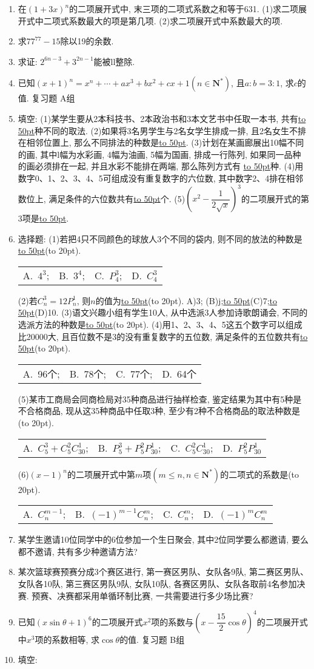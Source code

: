 \documentclass[10pt,a4paper]{article}
\newcommand{\blank}[1]{\underline{\hbox to #1pt{}}}
\newcommand{\bracket}[1]{(\hbox to #1pt{})}
\newcommand{\fourch}[4]{\par\begin{tabular}{p{.23\textwidth}p{.23\textwidth}p{.23\textwidth}p{.23\textwidth}}
A.~#1 &B.~#2& C.~#3& D.~#4
\end{tabular}}
\begin{document}
\begin{enumerate}[1.]
\item 在$(1+3x)^n$的二项展开式中, 末三项的二项式系数之和等于631.
(1)求二项展开式中二项式系数最大的项是第几项.
(2)求二项展开式中系数最大的项.
\item 求$77^{77}-15$除以19的余数.
\item 求证: $2^{6n-3}+3^{2n-1}$能被ll整除.
\item 已知$(x+1)^n=x^n+\cdots +ax^3+bx^2+cx+1(n\in \mathbf{N}^*)$, 且$a:b=3:1$, 求$c$的值.
复习题
A组
\item 填空:
(1)某学生要从2本科技书、2本政治书和3本文艺书中任取一本书, 共有\blank{50}种不同的取法.
(2)如果将3名男学生与2名女学生排成一排, 且2名女生不排在相邻位置上, 那么不同排法的种数是\blank{50}.
(3)计划在某画廊展出10幅不同的画, 其中l幅为水彩画, 4幅为油画, 5幅为国画, 排成一行陈列, 如果同一品种的画必须排在一起, 并且水彩不能排在两端, 那么陈列方式有	\blank{50}种.
(4)用数字0、1、2、3、4、5可组成没有重复数字的六位数, 其中数字2、4排在相邻数位上, 满足条件的六位数共有\blank{50}个.
(5)$(x^2-\dfrac 1{2\sqrt x})^3$的二项展开式的第3项是\blank{50}.
\item 选择题:
(1)若把4只不同颜色的球放人3个不同的袋内, 则不同的放法的种数是\blank{50}\bracket{20}.
\fourch{$4^3$;}{$3^4$;}{$P_4^3$;}{$C_4^3$}
(2)若$C_n^3=12P_n^1$, 则$n$的值为\blank{50}\bracket{20}.
A)3;    (B)j;\blank{50}(C)7;\blank{50}(D)10.
(3)语文兴趣小组有学生10人, 从中选派3人参加诗歌朗诵会, 不同的选派方法的种数是\blank{50}\bracket{20}.
(4)用1、2、3、4、5这五个数字可以组成比20000大, 且百位数不是3的没有重复数字的五位数, 满足条件的五位数共有\blank{50}\bracket{20}.
    \fourch{96个;}{78个;}{77个;}{64个}
(5)某市工商局会同商检局对35种商品进行抽样检查, 鉴定结果为其中有5种是不合格商品, 现从这35种商品中任取3种, 至少有2种不合格商品的取法种数是\bracket{20}.
\fourch{$C_5^3+C_5^2C_{30}^1$;}{$P_5^3+P_5^2P_{30}^1$;}{$C_5^2C_{30}^1$;}{$P_5^2P_{30}^1$}
(6)$(x-1)^n$的二项展开式中第$m$项$(m\le n,n\in \mathbf{N}^*)$的二项式的系数是\bracket{20}.
\fourch{$C_n^{m-1}$;}{$(-1)^{m-1}C_n^m$;}{$C_n^m$;}{$(-1)^mC_n^m$}
\item 某学生邀请10位同学中的6位参加一个生日聚会, 其中2位同学要么都邀请, 要么都不邀请, 共有多少种邀请方法?
\item 某次篮球赛预赛分成3个赛区进行, 第一赛区男队、女队各9队, 第二赛区男队、女队各10队, 第三赛区男队9队, 女队10队, 各赛区男队、女队各取前4名参加决赛. 预赛、决赛都采用单循环制比赛, 一共需要进行多少场比赛?
\item 已知$(x\sin \theta +1)^6$的二项展开式$x^2$项的系数与$(x-\dfrac{15}2\cos \theta)^4$的二项展开式中$x^3$项的系数相等, 求$\cos \theta$的值.
复习题
B组
\item 填空:

\end{enumerate}
\end{document}
